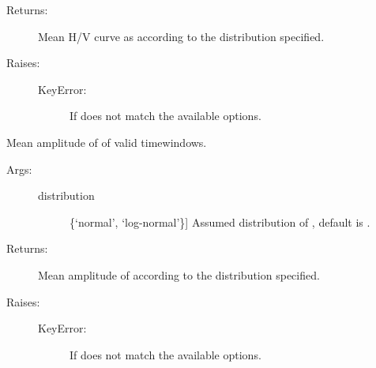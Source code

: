 \documentclass[letterpaper,10pt,english,openany,oneside]{sphinxmanual}
\begin{document}
\begin{fulllineitems}
\begin{fulllineitems}
\begin{description}
\item[{Returns:}] \leavevmode
Mean H/V curve as  according to the distribution
specified.

\item[{Raises:}] \leavevmode\begin{description}
\item[{KeyError:}] \leavevmode
If  does not match the available options.

\end{description}

\end{description}

\end{fulllineitems}


\begin{fulllineitems}
\label{\detokenize{index:hvsrpy.Hvsr.mean_f0_amp}}
Mean amplitude of  of valid timewindows.
\begin{description}
\item[{Args:}] \leavevmode\begin{description}
\item[{distribution}] \leavevmode{[}\{‘normal’, ‘log-normal’\}{]}
Assumed distribution of , default is .

\end{description}

\item[{Returns:}] \leavevmode
Mean amplitude of  according to the distribution
specified.

\item[{Raises:}] \leavevmode\begin{description}
\item[{KeyError:}] \leavevmode
If  does not match the available options.

\end{description}

\end{description}

\end{fulllineitems}



\end{fulllineitems}
\end{document}

